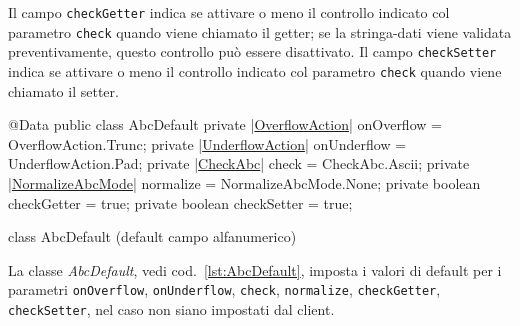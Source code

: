 \documentclass[a4paper,10pt]{report}
\newif\ifesource
\newenvironment{elisting}[1][!htb]
  {\captionsetup{aboveskip=0pt}\begin{listing}[#1]}
  {\end{listing}%
}
\begin{document}
Il campo \hypertarget{abc:get}{\texttt{checkGetter}} indica se attivare o meno 
il controllo indicato col parametro \verb!check! quando viene chiamato il 
getter; se la stringa-dati viene validata preventivamente, questo controllo può 
essere disattivato.
Il campo \hypertarget{abc:set}{\texttt{checkSetter}} indica se attivare o meno 
il controllo indicato col parametro \verb!check! quando viene chiamato il 
setter.

\ifesource
\begin{figure*}[!htb]
\begin{lstlisting}[language=java, 
caption=class AbcDefault (default campo alfanumerico), 
label=lst:AbcDefault]
@Data
public class AbcDefault {
    private (*\hyperref[lst:OverflowAction]{OverflowAction}*) onOverflow = OverflowAction.Trunc;
    private (*\hyperref[lst:UnderflowAction]{UnderflowAction}*) onUnderflow = UnderflowAction.Pad;
    private (*\hyperref[lst:CheckAbc]{CheckAbc}*) check = CheckAbc.Ascii;
    private (*\hyperref[lst:NormalizeAbcMode]{NormalizeAbcMode}*) normalize = NormalizeAbcMode.None;
    private boolean checkGetter = true;
    private boolean checkSetter = true;
}
\end{lstlisting}\index{AbcDefault}
\end{figure*}
\else
\begin{elisting}
\begin{javacode}
@Data
public class AbcDefault {
    private |\hyperref[lst:OverflowAction]{OverflowAction}| onOverflow = OverflowAction.Trunc;
    private |\hyperref[lst:UnderflowAction]{UnderflowAction}| onUnderflow = UnderflowAction.Pad;
    private |\hyperref[lst:CheckAbc]{CheckAbc}| check = CheckAbc.Ascii;
    private |\hyperref[lst:NormalizeAbcMode]{NormalizeAbcMode}| normalize = NormalizeAbcMode.None;
    private boolean checkGetter = true;
    private boolean checkSetter = true;
}
\end{javacode}
\caption{class AbcDefault (default campo alfanumerico)}
\label{lst:AbcDefault}
\end{elisting}
\fi

La classe \textsl{AbcDefault}, vedi cod.~\ref{lst:AbcDefault}, imposta i valori
di default per i parametri \verb!onOverflow!, \verb!onUnderflow!, \verb!check!, 
\verb!normalize!, \verb!checkGetter!, \verb!checkSetter!, nel caso non siano 
impostati dal client.
\end{document}
